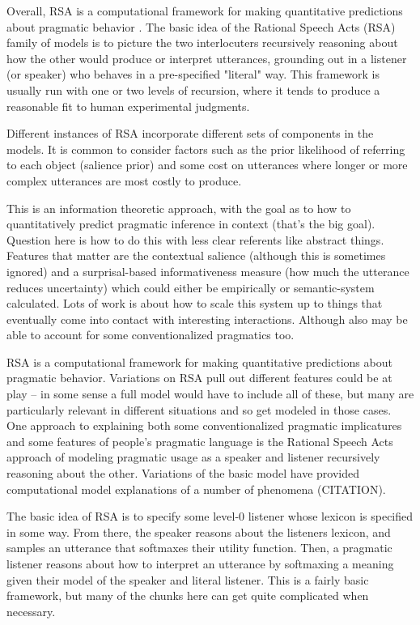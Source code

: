 \documentclass[]{article}
\begin{document}
Overall, RSA is a computational framework for making quantitative predictions about pragmatic behavior \cite{goodman2016}. The basic idea of the Rational Speech Acts (RSA) family of models is to picture the two interlocuters recursively reasoning about how the other would produce or interpret utterances, grounding out in a listener (or speaker) who behaves in a pre-specified "literal" way. This framework is usually run with one or two levels of recursion, where it tends to produce a reasonable fit to human experimental judgments. 

Different instances of RSA incorporate different sets of components in the models. It is common to consider factors such as the prior likelihood of referring to each object (salience prior) and some cost on utterances where longer or more complex utterances are most costly to produce. 

\cite{frank2012a} This is an information theoretic approach, with the goal as to how to quantitatively predict pragmatic inference in context (that's the big goal). Question here is how to do this with less clear referents like abstract things. Features that matter are the contextual salience (although this is sometimes ignored) and a surprisal-based informativeness measure (how much the utterance reduces uncertainty) which could either be empirically or semantic-system calculated. Lots of work is about how to scale this system up to things that eventually come into contact with interesting interactions. Although also may be able to account for some conventionalized pragmatics too. 

\cite{goodman2016} RSA is a computational framework for making quantitative predictions about pragmatic behavior. Variations on RSA pull out different features could be at play -- in some sense a full model would have to include all of these, but many are particularly relevant in different situations and so get modeled in those cases. 
One approach to explaining both some conventionalized pragmatic implicatures and some features of people's pragmatic language is the Rational Speech Acts approach of modeling pragmatic usage as a speaker and listener recursively reasoning about the other. Variations of the basic model have provided computational model explanations of a number of phenomena (CITATION). 

The basic idea of RSA is to specify some level-0 listener whose lexicon is specified in some way. From there, the speaker reasons about the listeners lexicon, and samples an utterance that softmaxes their utility function. Then, a pragmatic listener reasons about how to interpret an utterance by softmaxing a meaning given their model of the speaker and literal listener. This is a fairly basic framework, but many of the chunks here can get quite complicated when necessary. 
\end{document}
